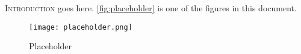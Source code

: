 \lettrine[nindent=0pt]{I}{ntroduction} goes here. \autoref{fig:placeholder} is one of the figures in this document.

\begin{figure}
    \begin{center}
    \texttt{[image: placeholder.png]}
    \caption{Placeholder}
    \label{fig:placeholder}
    \end{center}
\end{figure}